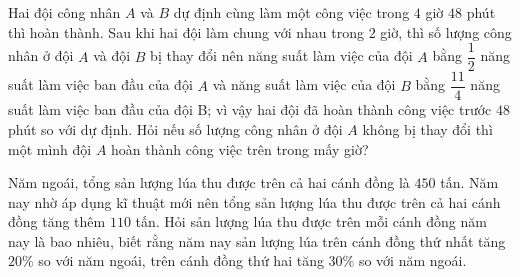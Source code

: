\begin{bt}%
	Hai đội công nhân $A$ và $B$ dự định cùng làm một công việc trong $4$ giờ $48$ phút thì hoàn thành. Sau khi hai đội làm chung với nhau trong $2$ giờ, thì số lượng công nhân ở đội $A$ và đội $B$ bị thay đổi nên năng suất làm việc của đội $A$ bằng $\dfrac{1}{2}$ năng suất làm việc ban đầu của đội $A$ và năng suất làm việc của đội $B$ bằng $\dfrac{11}{4}$ năng suất làm việc ban đầu của đội B; vì vậy hai đội đã hoàn thành công việc trước $48$ phút so với dự định. Hỏi nếu số lượng công nhân ở đội $A$ không bị thay đổi thì một mình đội $A$ hoàn thành công việc trên trong mấy giờ?
\end{bt}

\begin{bt}%
	Năm ngoái, tổng sản lượng lúa thu được trên cả hai cánh đồng là $450$ tấn. Năm nay nhờ áp dụng kĩ thuật mới nên tổng sản lượng lúa thu được trên cả hai cánh đồng tăng thêm $110$ tấn. Hỏi sản lượng lúa thu được trên mỗi cánh đồng năm nay là bao nhiêu, biết rằng năm nay sản lượng lúa trên cánh đồng thứ nhất tăng $20\%$ so với năm ngoái, trên cánh đồng thứ hai tăng $30\%$ so với năm ngoái.
\end{bt}


